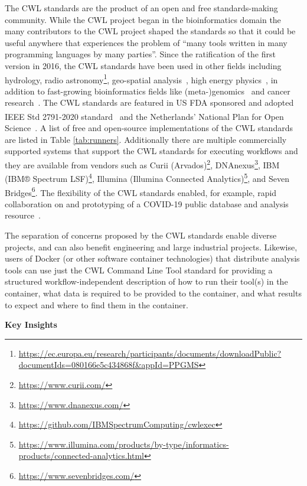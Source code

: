 The CWL standards are the product of an open and free standards-making community. While the CWL project began in the bioinformatics domain the many contributors to the CWL project shaped the standards so that it could be useful anywhere that experiences the problem of ``many tools written in many programming languages by many parties''. Since the ratification of the first version in 2016, the CWL standards have been used in other fields including hydrology, radio astronomy\footnote{\url{https://ec.europa.eu/research/participants/documents/downloadPublic?documentIds=080166e5c434868f&appId=PPGMS}}, geo-spatial analysis~\cite{simonis_ogc_2020,goncalves_ogc_2020,landry_ogc_2020}, high energy physics~\cite{bell_web-based_2017}, in addition to fast-growing bioinformatics fields like (meta-)genomics~\cite{mitchell_mgnify_2020} and cancer research~\cite{lau_cancer_2017}. The CWL standards are featured in US FDA sponsored and adopted IEEE Std 2791\textsuperscript{\texttrademark}-2020 standard~\cite{Mazumder2020} and the Netherlands' National Plan for Open Science~\cite{van_wezenbeek_nationaal_2017}. A list of free and open-source implementations of the CWL standards are listed in Table \ref{tab:runners}. Additionally there are multiple commercially supported systems that support the CWL standards for executing workflows and they are available from vendors such as Curii (Arvados)\footnote{\url{https://www.curii.com/}}, DNAnexus\footnote{\url{https://www.dnanexus.com/}}, IBM (IBM® Spectrum LSF)\footnote{\url{https://github.com/IBMSpectrumComputing/cwlexec}}, Illumina (Illumina Connected Analytics)\footnote{\url{https://www.illumina.com/products/by-type/informatics-products/connected-analytics.html}}, and Seven Bridges\footnote{\url{https://www.sevenbridges.com/}}. The flexibility of the CWL standards enabled, for example, rapid collaboration on and prototyping of a COVID-19 public database and analysis resource~\cite{guarracino_covid-19_2020}.

The separation of concerns proposed by the CWL standards enable diverse projects, and can also benefit engineering and large industrial projects. Likewise, users of Docker (or other software container technologies) that distribute analysis tools can use just the CWL Command Line Tool standard for providing a structured workflow-independent description of how to run their tool(s) in the container, what data is required to be provided to the container, and what results to expect and where to find them in the container.

\textbf{Key Insights}

